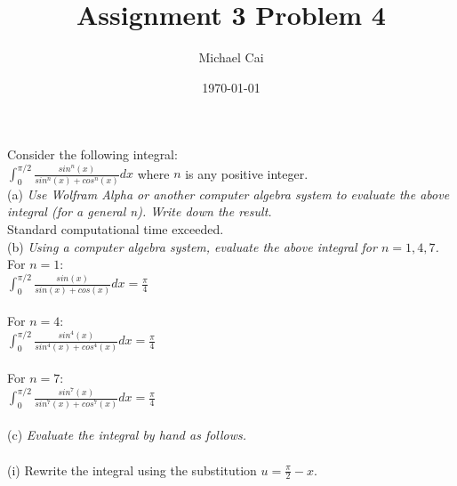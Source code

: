 \documentclass[11pt, oneside]{article}   	%
\title{Assignment 3 Problem 4}
\author{Michael Cai}
\date{\today}							%
\begin{document}
\maketitle

\noindent Consider the following integral:\\
$\int_0^{\pi/2} \frac{sin^n(x)}{sin^n(x) + cos^n(x)} dx$ where $n$ is any positive integer.\\

\noindent (a) \textit{Use Wolfram Alpha or another computer algebra system to evaluate the above integral (for a general n). Write down the result.}\\
Standard computational time exceeded.\\

\noindent (b) \textit{Using a computer algebra system, evaluate the above integral for $n = 1,4,7$.}\\
For $n = 1$:\\
$\int_0^{\pi/2} \frac{sin(x)}{sin(x) + cos(x)} dx = \frac{\pi}{4}$\\~\\
For $n = 4$:\\
$\int_0^{\pi/2} \frac{sin^4(x)}{sin^4(x) + cos^4(x)} dx = \frac{\pi}{4}$\\~\\
For $n = 7$:\\
$\int_0^{\pi/2} \frac{sin^7(x)}{sin^7(x) + cos^7(x)} dx = \frac{\pi}{4}$\\~\\

\noindent (c) \textit{Evaluate the integral by hand as follows.}\\~\\
(i) Rewrite the integral using the substitution $u = \frac{\pi}{2} - x$.\\
\end{document}
